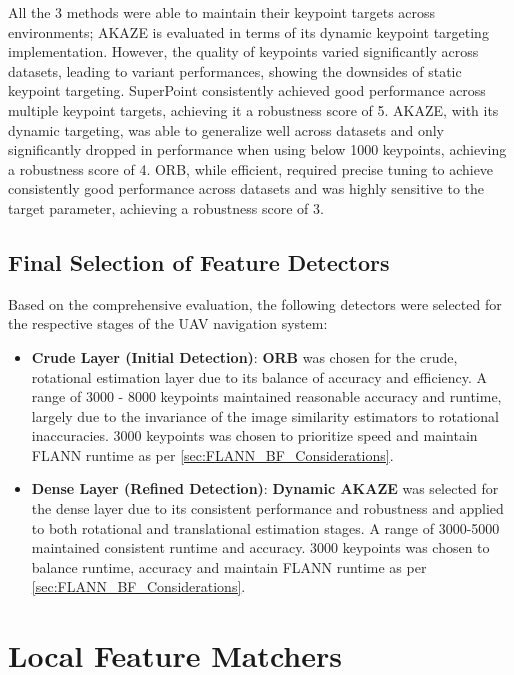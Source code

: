 All the 3 methods were able to maintain their keypoint targets across environments; AKAZE is evaluated in terms of its dynamic keypoint targeting implementation. However, the quality of keypoints varied significantly across datasets, leading to variant performances, showing the downsides of static keypoint targeting. SuperPoint consistently achieved good performance across multiple keypoint targets, achieving it a robustness score of 5. AKAZE, with its dynamic targeting, was able to generalize well across datasets and only significantly dropped in performance when using below 1000 keypoints, achieving a robustness score of 4. ORB, while efficient, required precise tuning to achieve consistently good performance across datasets and was highly sensitive to the target parameter, achieving a robustness score of 3.

\subsection{Final Selection of Feature Detectors}

Based on the comprehensive evaluation, the following detectors were selected for the respective stages of the UAV navigation system:

\begin{itemize}
    \item \textbf{Crude Layer (Initial Detection)}: \textbf{ORB} was chosen for the crude, rotational estimation layer due to its balance of accuracy and efficiency. A range of 3000 - 8000 keypoints maintained reasonable accuracy and runtime, largely due to the invariance of the image similarity estimators to rotational inaccuracies. 3000 keypoints was chosen to prioritize speed and maintain FLANN runtime as per \ref{sec:FLANN_BF_Considerations}.
    
    \item \textbf{Dense Layer (Refined Detection)}: \textbf{Dynamic AKAZE} was selected for the dense layer due to its consistent performance and robustness and applied to both rotational and translational estimation stages. A range of 3000-5000 maintained consistent runtime and accuracy. 3000 keypoints was chosen to balance runtime, accuracy and maintain FLANN runtime as per \ref{sec:FLANN_BF_Considerations}.
\end{itemize}


\section{Local Feature Matchers}


